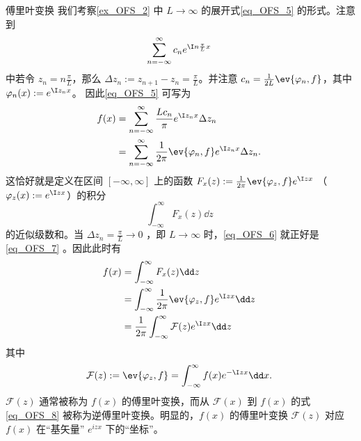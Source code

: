 \begin{example}{傅里叶变换}\label{ex_OFS_3}
我们考察\autoref{ex_OFS_2} 中 $L\rightarrow\infty$ 的展开式\autoref{eq_OFS_5} 的形式。注意到
\[
  \sum_{n=-\infty}^\infty c_ne^{\I n\frac{\pi}{L} x}~  
\]
中若令 $z_n=n\frac{\pi}{L}$，那么 $\Delta z_n:=z_{n+1}-z_n=\frac{\pi}{L}$。并注意 $c_n=\frac{1}{2L}\ev{\varphi_n,f}$，其中 $\varphi_n(x):=e^{\I z_n x}$。 因此\autoref{eq_OFS_5} 可写为
\begin{equation}\label{eq_OFS_6}
\begin{aligned}
f(x)&=\sum_{n=-\infty}^\infty \frac{Lc_n}{\pi}e^{\I z_n x}\Delta z_n\\
&=\sum_{n=-\infty}^\infty \frac{1}{2\pi}\ev{\varphi_n,f}e^{\I z_n x}\Delta z_n.
\end{aligned}~
\end{equation}
这恰好就是定义在区间 $[-\infty,\infty]$ 上的函数 $F_x(z):=\frac{1}{2\pi}\ev{\varphi_z,f}e^{\I z x}$ （$\varphi_z(x):=e^{\I z x}$）的积分
\begin{equation}\label{eq_OFS_7}
\int_{-\infty}^\infty F_x(z)\dd z~
\end{equation}
的近似级数和。当 $\Delta z_n=\frac{\pi}{L}\rightarrow0$ ，即 $L\rightarrow\infty$ 时，\autoref{eq_OFS_6} 就正好是\autoref{eq_OFS_7} 。因此此时有
\begin{equation}\label{eq_OFS_8}
\begin{aligned}
f(x)&=\int_{-\infty}^\infty F_x(z)\dd z\\
&=\int_{-\infty}^\infty\frac{1}{2\pi}\ev{\varphi_z,f}e^{\I z x}\dd z\\
&=\frac{1}{2\pi}\int_{-\infty}^\infty\mathcal F(z)e^{\I z x}\dd z\\
\end{aligned}~
\end{equation}
其中
\begin{equation}
\mathcal F(z):=\ev{\varphi_z,f}=\int_{-\infty}^\infty f(x)e^{-\I zx}\dd x.~
\end{equation}
$\mathcal F(z)$ 通常被称为 $f(x)$ 的傅里叶变换，而从 $\mathcal F(x)$ 到 $f(x)$ 的式\autoref{eq_OFS_8} 被称为逆傅里叶变换。明显的，$f(x)$ 的傅里叶变换 $\mathcal F(z)$ 对应 $f(x)$ 在“基矢量” $e^{izx}$ 下的“坐标”。
\end{example}